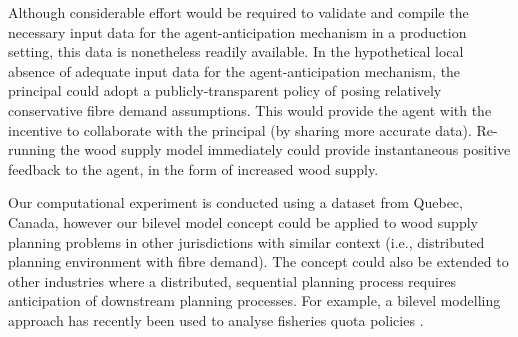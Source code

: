 Although considerable effort would be required to validate and compile the necessary input data for the agent-anticipation mechanism in a production setting, this data is nonetheless readily available. In the hypothetical local absence of adequate input data for the agent-anticipation mechanism, the principal could adopt a publicly-transparent policy of posing relatively conservative fibre demand assumptions. This would provide the agent with the incentive to collaborate with the principal (by sharing more accurate data). Re-running the wood supply model immediately could provide instantaneous positive feedback to the agent, in the form of increased wood supply.





Our computational experiment is conducted using a dataset from Quebec, Canada, however our bilevel model concept could be applied to wood supply planning problems in other jurisdictions with similar context (i.e., distributed planning environment with fibre demand). The concept could also be extended to other industries where a distributed, sequential planning process requires anticipation of downstream planning processes. For example, a bilevel modelling approach has recently been used to analyse fisheries quota policies \citep{vandijk2014solving}.
 

